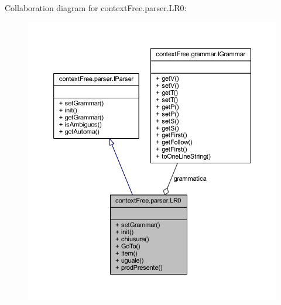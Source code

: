 Collaboration diagram for context\-Free.\-parser.\-L\-R0\-:\nopagebreak
\begin{figure}[H]
\begin{center}
\leavevmode
\includegraphics[width=350pt]{classcontext_free_1_1parser_1_1_l_r0__coll__graph}
\end{center}
\end{figure}
